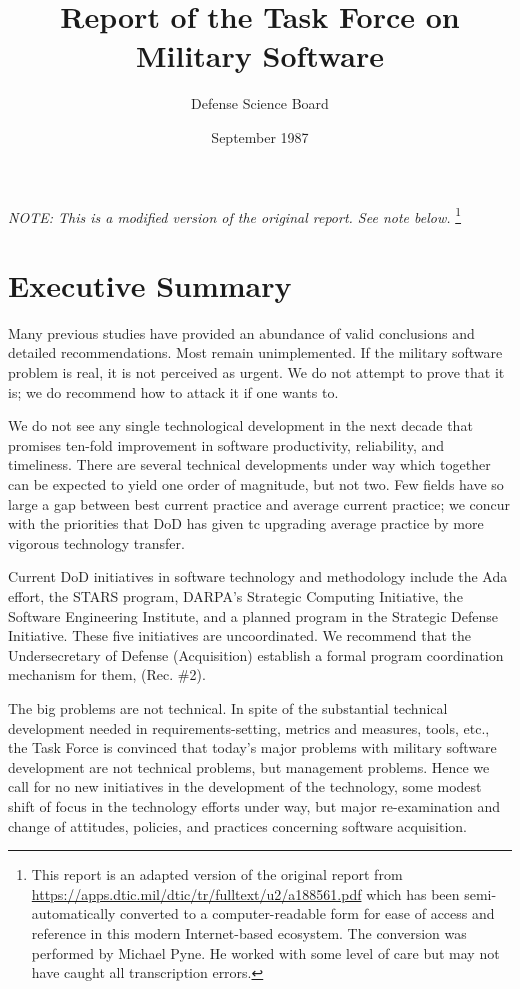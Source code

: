 \documentclass[12pt]{article}
\begin{document}
\title{Report of the Task Force on Military Software}
\author{Defense Science Board}
\date{September 1987}

\maketitle

\emph{NOTE: This is a modified version of the original report. See note below.}
\footnote{This report is an adapted version of the original report from
\url{https://apps.dtic.mil/dtic/tr/fulltext/u2/a188561.pdf} which has been
semi-automatically converted to a computer-readable form for ease of access and
reference in this modern Internet-based ecosystem. The conversion was performed
by Michael Pyne. He worked with some level of care but may not have caught all
transcription errors.}

\section{Executive Summary}

Many previous studies have provided an abundance of valid conclusions and
detailed recommendations. Most remain unimplemented. If the military software
problem is real, it is not perceived as urgent. We do not attempt to prove
that it is; we do recommend how to attack it if one wants to.

We do not see any single technological development in the next decade that
promises ten-fold improvement in software productivity, reliability, and
timeliness. There are several technical developments under way which together
can be expected to yield one order of magnitude, but not two. Few fields have
so large a gap between best current practice and average current practice; we
concur with the priorities that DoD has given tc upgrading average practice by
more vigorous technology transfer.

Current DoD initiatives in software technology and methodology include the Ada
effort, the STARS program, DARPA's Strategic Computing Initiative, the
Software Engineering Institute, and a planned program in the Strategic Defense
Initiative. These five initiatives are uncoordinated. We recommend that the
Undersecretary of Defense (Acquisition) establish a formal program
coordination mechanism for them, (Rec. \#2).

The big problems are not technical. In spite of the substantial technical
development needed in requirements-setting, metrics and measures, tools, etc.,
the Task Force is convinced that today's major problems with military software
development are not technical problems, but management problems. Hence we call
for no new initiatives in the development of the technology, some modest shift
of focus in the technology efforts under way, but major re-examination and
change of attitudes, policies, and practices concerning software acquisition.
\end{document}
